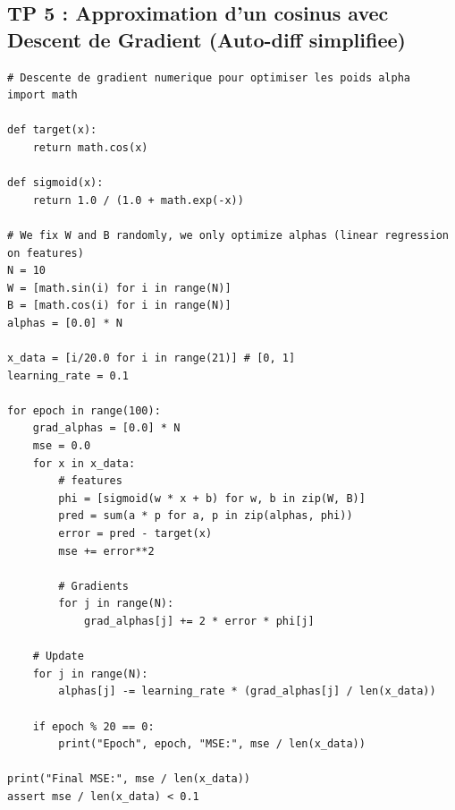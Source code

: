 \documentclass[11pt,a4paper]{article}
\begin{document}
\vspace{1cm}
\subsection*{TP 5 : Approximation d'un cosinus avec Descent de Gradient (Auto-diff simplifiee)}

\begin{lstlisting}
# Descente de gradient numerique pour optimiser les poids alpha
import math

def target(x):
    return math.cos(x)

def sigmoid(x):
    return 1.0 / (1.0 + math.exp(-x))

# We fix W and B randomly, we only optimize alphas (linear regression on features)
N = 10
W = [math.sin(i) for i in range(N)]
B = [math.cos(i) for i in range(N)]
alphas = [0.0] * N

x_data = [i/20.0 for i in range(21)] # [0, 1]
learning_rate = 0.1

for epoch in range(100):
    grad_alphas = [0.0] * N
    mse = 0.0
    for x in x_data:
        # features
        phi = [sigmoid(w * x + b) for w, b in zip(W, B)]
        pred = sum(a * p for a, p in zip(alphas, phi))
        error = pred - target(x)
        mse += error**2

        # Gradients
        for j in range(N):
            grad_alphas[j] += 2 * error * phi[j]

    # Update
    for j in range(N):
        alphas[j] -= learning_rate * (grad_alphas[j] / len(x_data))

    if epoch % 20 == 0:
        print("Epoch", epoch, "MSE:", mse / len(x_data))

print("Final MSE:", mse / len(x_data))
assert mse / len(x_data) < 0.1

\end{lstlisting}

\vspace{1cm}
\end{document}
